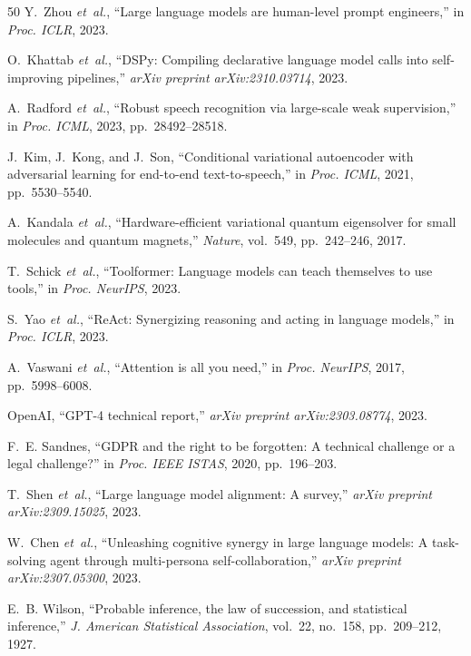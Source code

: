\documentclass[11pt,a4paper]{article}
\begin{document}
\begin{thebibliography}{50}
Y.~Zhou \emph{et~al.}, ``Large language models are human-level prompt engineers,'' in \emph{Proc. ICLR}, 2023.

O.~Khattab \emph{et~al.}, ``DSPy: Compiling declarative language model calls into self-improving pipelines,'' \emph{arXiv preprint arXiv:2310.03714}, 2023.

A.~Radford \emph{et~al.}, ``Robust speech recognition via large-scale weak supervision,'' in \emph{Proc. ICML}, 2023, pp.~28492--28518.

J.~Kim, J.~Kong, and J.~Son, ``Conditional variational autoencoder with adversarial learning for end-to-end text-to-speech,'' in \emph{Proc. ICML}, 2021, pp.~5530--5540.

A.~Kandala \emph{et~al.}, ``Hardware-efficient variational quantum eigensolver for small molecules and quantum magnets,'' \emph{Nature}, vol.~549, pp.~242--246, 2017.

T.~Schick \emph{et~al.}, ``Toolformer: Language models can teach themselves to use tools,'' in \emph{Proc. NeurIPS}, 2023.

S.~Yao \emph{et~al.}, ``ReAct: Synergizing reasoning and acting in language models,'' in \emph{Proc. ICLR}, 2023.

A.~Vaswani \emph{et~al.}, ``Attention is all you need,'' in \emph{Proc. NeurIPS}, 2017, pp.~5998--6008.

OpenAI, ``GPT-4 technical report,'' \emph{arXiv preprint arXiv:2303.08774}, 2023.

F.~E. Sandnes, ``GDPR and the right to be forgotten: A technical challenge or a legal challenge?'' in \emph{Proc. IEEE ISTAS}, 2020, pp.~196--203.

T.~Shen \emph{et~al.}, ``Large language model alignment: A survey,'' \emph{arXiv preprint arXiv:2309.15025}, 2023.

W.~Chen \emph{et~al.}, ``Unleashing cognitive synergy in large language models: A task-solving agent through multi-persona self-collaboration,'' \emph{arXiv preprint arXiv:2307.05300}, 2023.

E.~B. Wilson, ``Probable inference, the law of succession, and statistical inference,'' \emph{J. American Statistical Association}, vol.~22, no.~158, pp.~209--212, 1927.

\end{thebibliography}
\end{document}
